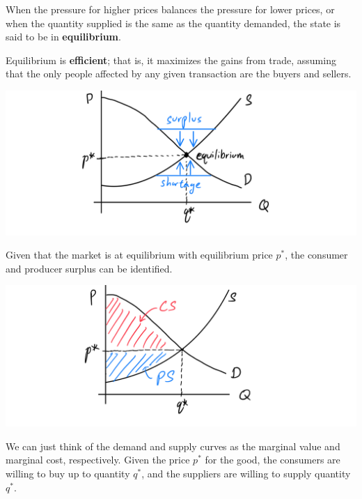 \documentclass{article}
\begin{document}
    \begin{definition}[Equilibrium]
      When the pressure for higher prices balances the pressure for lower prices, or when the quantity supplied is the same as the quantity demanded, the state is said to be in \textbf{equilibrium}. 

      Equilibrium is \textbf{efficient}; that is, it maximizes the gains from trade, assuming that the only people affected by any given transaction are the buyers and sellers. 
    \end{definition}

    \begin{center}
      \includegraphics[scale=0.25]{img/Equilibrium_Surplus_Shortage.PNG}
    \end{center}

    \begin{definition}
      Given that the market is at equilibrium with equilibrium price $p^*$, the consumer and producer surplus can be identified. 
      \begin{center}
        \includegraphics[scale=0.25]{img/Consumer_Producer_Surplus.PNG}
      \end{center}
      We can just think of the demand and supply curves as the marginal value and marginal cost, respectively. Given the price $p^*$ for the good, the consumers are willing to buy up to quantity $q^*$, and the suppliers are willing to supply quantity $q^*$. 
    \end{definition}
\end{document}
